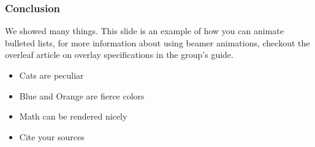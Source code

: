 \begin{frame}
        \frametitle{Conclusion}
        We showed many things. This slide is an example of how
        you can animate bulleted lists, for more information about
        using beamer animations, checkout the overleaf article on
        overlay specifications in the group's guide.
        \begin{itemize}
                \item Cats are peculiar
                      \pause
                \item Blue and Orange are fierce colors
                      \pause
                \item Math can be rendered nicely
                      \pause
                \item Cite your sources
        \end{itemize}
\end{frame}
